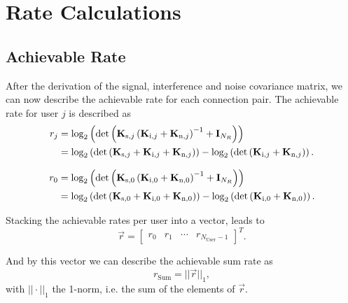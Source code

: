 


\section{Rate Calculations}
\label{sec:rates}

\subsection{Achievable Rate}
\label{sec:achiev_rate}
After the derivation of the signal, interference and noise covariance matrix, we can now describe the achievable rate for each connection pair.
The achievable rate for user $j$ is described as
\begin{align}
\label{eq:achiev_rate}
\nonumber
r_j &= \text{log}_2\left(\text{det}\left(\mathbf{K}_{\text{s},j}\left(\mathbf{K}_{\text{i},j}+\mathbf{K}_{\text{n},j}\right)^{-1}+\mathbf{I}_{N_R}\right)\right)\\
 &=\text{log}_2\left(
	\text{det}\left(\mathbf{K}_{\text{s},j}+
		\mathbf{K}_{\text{i},j}+\mathbf{K}_{\text{n},j}\right)\right) -
	\text{log}_2\left(\text{det}\left(\mathbf{K}_{\text{i},j}+\mathbf{K}_{\text{n},j}\right)\right).
\end{align}

\begin{align}
\label{eq:achiev_rate}
r_0 &= \text{log}_2\left(\text{det}\left(\mathbf{K}_{\text{s},0}\left(\mathbf{K}_{\text{i},0}+\mathbf{K}_{\text{n},0}\right)^{-1}+\mathbf{I}_{N_R}\right)\right)\\
 &=\text{log}_2\left(
	\text{det}\left(\mathbf{K}_{\text{s},0}+
		\mathbf{K}_{\text{i},0}+\mathbf{K}_{\text{n},0}\right)\right) -
	\text{log}_2\left(\text{det}\left(\mathbf{K}_{\text{i},0}+\mathbf{K}_{\text{n},0}\right)\right).
\end{align}

Stacking the achievable rates per user into a vector, leads to 
\begin{equation}
\label{eq:achiev_vec}
\vec{r} =
\begin{bmatrix}
r_0 & r_1 & \cdots & r_{N_\text{User}-1}
\end{bmatrix}^T.
\end{equation}

And by this vector we can describe the achievable sum rate as
\begin{equation}
\label{eq:achiev_sum_rate}
r_\text{Sum} = ||\vec{r}||_1,
\end{equation}
with $||\cdot||_1$ the 1-norm, i.e. the sum of the elements of $\vec{r}$.

